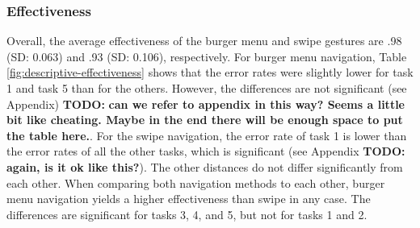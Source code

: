 \documentclass{sig-alternate-05-2015}
\newcommand{\todo}{\textbf{TODO:} \textbf}
\begin{document}
\subsubsection{Effectiveness}
Overall, the average effectiveness of the burger menu and swipe gestures are .98 (SD: 0.063) and .93 (SD: 0.106), respectively. For burger menu navigation, 
Table \ref{fig:descriptive-effectiveness} shows that the error rates were slightly lower for task 1 and task 5 than for the others. However, the differences
are not significant (see Appendix) \todo{can we refer to appendix in this way? Seems a little bit like cheating. Maybe in the end there will be enough space to put the 
table here.}. For the swipe navigation, the error rate of task 1 is lower than the error rates of all the other
tasks, which is significant (see Appendix \todo{again, is it ok like this?}).
The other distances do not differ significantly from each other. When
comparing both navigation methods to each other, burger menu navigation yields a higher effectiveness than swipe in any case.
The differences are significant for tasks 3, 4, and 5,
but not for tasks 1 and 2.
\begin{table}[!h]
\centering
\caption{Mean (standard deviation) of effectiveness}
\label{fig:descriptive-effectiveness}
\end{table}
\end{document}
